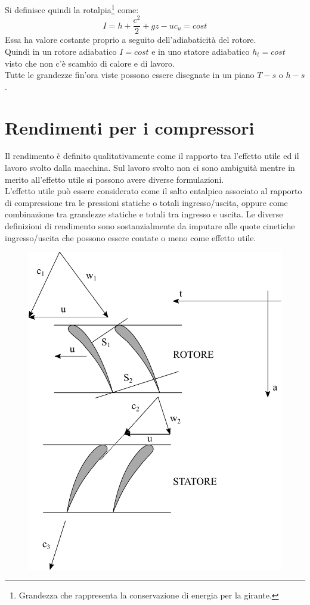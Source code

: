Si definisce quindi la rotalpia\footnote{Grandezza che rappresenta la conservazione di energia per la girante.} come:
\begin{equation}
I=h+\frac{c^2}{2}+gz-u c_u = cost
\end{equation}
Essa ha valore costante proprio a seguito dell'adiabaticità del rotore.\\
Quindi in un rotore adiabatico $I=cost$ e in uno statore adiabatico $h_t=cost$ visto che non c'è scambio di calore e di lavoro.\\
Tutte le grandezze fin'ora viste possono essere disegnate in un piano $T-s$ o $h-s$.
\section{Rendimenti per i compressori}
Il rendimento è definito qualitativamente come il rapporto tra l'effetto utile ed il lavoro svolto dalla macchina. Sul lavoro svolto non ci sono ambiguità mentre in merito all'effetto utile si possono avere diverse formulazioni.\\
L'effetto utile può essere considerato come il salto entalpico associato al rapporto di compressione tra le pressioni statiche o totali ingresso/uscita, oppure come combinazione tra grandezze statiche e totali tra ingresso e uscita. Le diverse definizioni di rendimento sono sostanzialmente da imputare alle quote cinetiche ingresso/uscita che possono essere contate o meno come effetto utile.
\begin{figure}
\centering
  \includegraphics[width=.5\textwidth]{fig/schieraTComp.pdf}
\caption{}
\label{fig:schieraTComp}
\end{figure}

